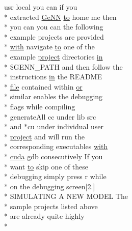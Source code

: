 \begin{DoxyCompactItemize}
usr local you can if you \\*
extracted \hyperlink{README_8txt_a431a8d9aae97c72793fee7c3edd68559}{Ge\+N\+N} \hyperlink{README_8txt_add1f2ee32acc15ef77f839d4382c9768}{to} home me then \\*
you can you can the following \\*
example projects are provided \\*
\hyperlink{userproject_2OneComp__project_2README_8txt_ace09bb40fbf4457ad9a9340a67a4fa9a}{with} navigate \hyperlink{README_8txt_add1f2ee32acc15ef77f839d4382c9768}{to} one of the \\*
example \hyperlink{userproject_2SynDelay__project_2README_8txt_a762c750134e07a31b7965860fd292b51}{project} directories \hyperlink{README_8txt_a148897a6b2cc9cff25af80abb13426b0}{in} \\*
\$G\+E\+N\+N\+\_\+\+P\+A\+T\+H and then follow the \\*
instructions \hyperlink{README_8txt_a148897a6b2cc9cff25af80abb13426b0}{in} the R\+E\+A\+D\+M\+E \\*
\hyperlink{README_8txt_a6f45b2930c1b79b67034355b4701dc56}{file} contained within \hyperlink{userproject_2PoissonIzh__project_2README_8txt_ad4021097ab0ba066271614bf3f4c2e27}{or} \\*
similar enables the debugging \\*
flags while compiling \\*
generate\+All cc under lib src \\*
and $\ast$cu under individual user \\*
\hyperlink{userproject_2SynDelay__project_2README_8txt_a762c750134e07a31b7965860fd292b51}{project} and will run the \\*
corresponding executables \hyperlink{userproject_2OneComp__project_2README_8txt_ace09bb40fbf4457ad9a9340a67a4fa9a}{with} \\*
\hyperlink{README_8txt_a386e5818501e36b046e9cf9ee9a1a6b0}{cuda} gdb consecutively If you \\*
want \hyperlink{README_8txt_add1f2ee32acc15ef77f839d4382c9768}{to} skip one of these \\*
debugging simply press r while \\*
on the debugging screen\mbox{[}2.\mbox{]} \\*
S\+I\+M\+U\+L\+A\+T\+I\+N\+G A N\+E\+W M\+O\+D\+E\+L The \\*
sample projects listed above \\*
are already quite highly \\*

\end{DoxyCompactItemize}
